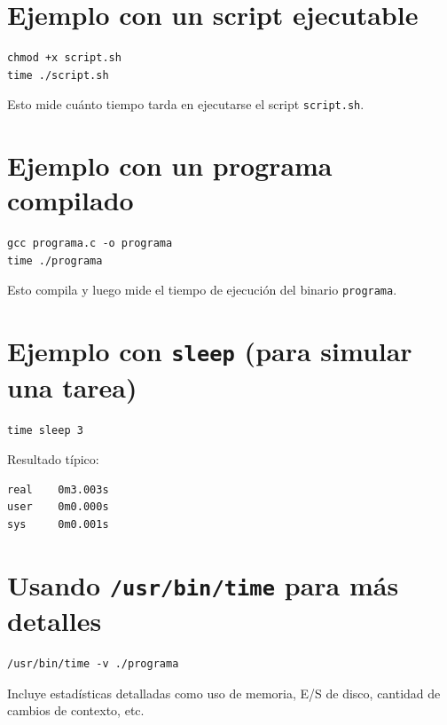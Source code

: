 \documentclass[12pt]{article}
\begin{document}
\section*{Ejemplo con un script ejecutable}

\begin{lstlisting}
chmod +x script.sh
time ./script.sh
\end{lstlisting}

Esto mide cuánto tiempo tarda en ejecutarse el script \texttt{script.sh}.

\section*{Ejemplo con un programa compilado}

\begin{lstlisting}
gcc programa.c -o programa
time ./programa
\end{lstlisting}

Esto compila y luego mide el tiempo de ejecución del binario \texttt{programa}.

\section*{Ejemplo con \texttt{sleep} (para simular una tarea)}

\begin{lstlisting}
time sleep 3
\end{lstlisting}

Resultado típico:
\begin{verbatim}
real    0m3.003s
user    0m0.000s
sys     0m0.001s
\end{verbatim}

\section*{Usando \texttt{/usr/bin/time} para más detalles}

\begin{lstlisting}
/usr/bin/time -v ./programa
\end{lstlisting}

Incluye estadísticas detalladas como uso de memoria, E/S de disco, cantidad de cambios de contexto, etc.
\end{document}
